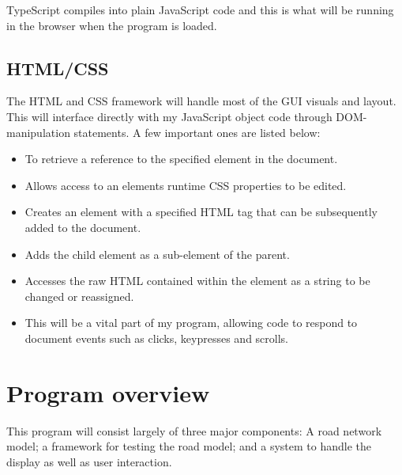         TypeScript compiles into plain JavaScript code and this is what will be running in the browser when the program is loaded.

    \subsection{HTML/CSS}
    \label{html/css}

        The HTML and CSS framework will handle most of the GUI visuals and layout. This will interface directly with my JavaScript object code through DOM-manipulation statements. A few important ones are listed below:

        \begin{itemize}
            \item {} To retrieve a reference to the specified element in the document.

            \item {} Allows access to an elements runtime CSS properties to be edited.

            \item {} Creates an element with a specified HTML tag that can be subsequently added to the document.

            \item {} Adds the child element as a sub-element of the parent.

            \item {} Accesses the raw HTML contained within the element as a string to be changed or reassigned.

            \item {} This will be a vital part of my program, allowing code to respond to document events such as clicks, keypresses and scrolls.
        \end{itemize}

\section{Program overview}

    This program will consist largely of three major components: A road network model; a framework for testing the road model; and a system to handle the display as well as user interaction.

